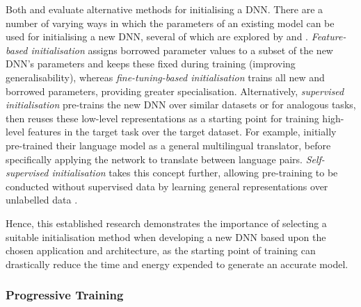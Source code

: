 \documentclass[a4paper, 11pt]{report}
\begin{document}
    Both \citet{hanin-2018} and \citet{xu-2021} evaluate alternative methods for initialising a DNN. There are a number of varying ways in which the parameters of an existing model can be used for initialising a new DNN, several of which are explored by\citet{hanin-2018} and \citet{xu-2021}. \emph{Feature-based initialisation} assigns borrowed parameter values to a subset of the new DNN's parameters and keeps these fixed during training (improving generalisability), whereas \emph{fine-tuning-based initialisation} trains all new and borrowed parameters, providing greater specialisation. Alternatively, \emph{supervised initialisation} pre-trains the new DNN over similar datasets or for analogous tasks, then reuses these low-level representations as a starting point for training high-level features in the target task over the target dataset. For example, \citet{lin-2021} initially pre-trained their language model as a general multilingual translator, before specifically applying the network to translate between language pairs. \emph{Self-supervised initialisation} takes this concept further, allowing pre-training to be conducted without supervised data by learning general representations over unlabelled data \citep{peters-2018}.

    Hence, this established research demonstrates the importance of selecting a suitable initialisation method when developing a new DNN based upon the chosen application and architecture, as the starting point of training can drastically reduce the time and energy expended to generate an accurate model.


    \subsubsection{Progressive Training}
    \label{section: progressive-training}
\end{document}
